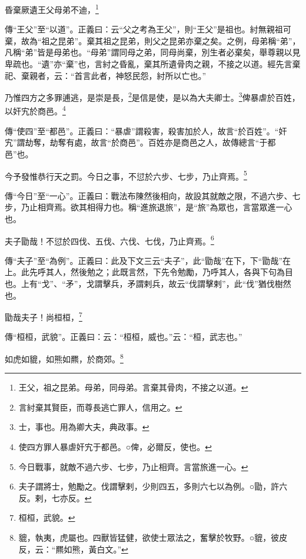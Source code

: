 昏棄厥遺王父母弟不迪，\footnote{王父，祖之昆弟。母弟，同母弟。言棄其骨肉，不接之以道。}

{\noindent\zhuan{}\fzbyks 傳“王父”至“以道”。正義曰：云“父之考為王父”，則“王父”是祖也。紂無親祖可棄，故為“祖之昆弟”。棄其祖之昆弟，則父之昆弟亦棄之矣。之例，母弟稱“弟”，凡稱“弟”皆是母弟也。“母弟”謂同母之弟，同母尚棄，別生者必棄矣，舉尊親以見卑疏也。“遺”亦“棄”也，言紂之昏亂，棄其所遺骨肉之親，不接之以道。經先言棄祀、棄親者，云：“首言此者，神怒民怨，紂所以亡也。” \par}

乃惟四方之多罪逋逃，是崇是長，\footnote{言紂棄其賢臣，而尊長逃亡罪人，信用之。}是信是使，是以為大夫卿士。\footnote{士，事也。用為卿大夫，典政事。}俾暴虐於百姓，以奸宄於商邑。\footnote{使四方罪人暴虐奸宄于都邑。○俾，必爾反，使也。}

{\noindent\zhuan{}\fzbyks 傳“使四”至“都邑”。正義曰：“暴虐”謂殺害，殺害加於人，故言“於百姓”。“奸宄”謂劫奪，劫奪有處，故言“於商邑”。百姓亦是商邑之人，故傳總言“于都邑”也。 \par}

今予發惟恭行天之罰。今日之事，不愆於六步、七步，乃止齊焉。\footnote{今日戰事，就敵不過六步、七步，乃止相齊。言當旅進一心。}

{\noindent\zhuan{}\fzbyks 傳“今日”至“一心”。正義曰：戰法布陳然後相向，故設其就敵之限，不過六步、七步，乃止相齊焉。欲其相得力也。稱“進旅退旅”，是“旅”為眾也，言當眾進一心也。 \par}

夫子勖哉！不愆於四伐、五伐、六伐、七伐，乃止齊焉。\footnote{夫子謂將士，勉勵之。伐謂擊剌，少則四五，多則六七以為例。○勖，許六反。剌，七亦反。}

{\noindent\zhuan{}\fzbyks 傳“夫子”至“為例”。正義曰：此及下文三云“夫子”，此“勖哉”在下，下“勖哉”在上。此先呼其人，然後勉之；此既言然，下先令勉勵，乃呼其人，各與下句為目也。上有“戈”、“矛”，戈謂擊兵，矛謂剌兵，故云“伐謂擊剌”，此“伐”猶伐樹然也。 \par}

勖哉夫子！尚桓桓，\footnote{桓桓，武貌。}

{\noindent\zhuan{}\fzbyks 傳“桓桓，武貌”。正義曰：云：“桓桓，威也。”云：“桓，武志也。” \par}

如虎如貔，如熊如羆，於商郊。\footnote{貔，執夷，虎屬也。四獸皆猛健，欲使士眾法之，奮擊於牧野。○貔，彼皮反，云：“羆如熊，黃白文。”}

